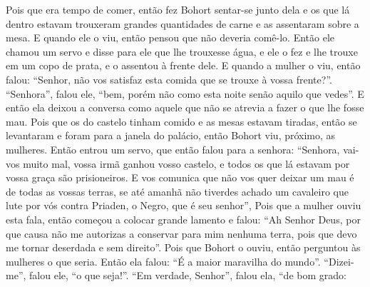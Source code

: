Pois que era tempo de comer, então fez Bohort sentar-se junto dela e os que lá
dentro estavam trouxeram grandes quantidades de carne e as assentaram sobre a
mesa. E quando ele o viu, então pensou que não deveria comê-lo. Então ele
chamou um servo e disse para ele que lhe trouxesse água, e ele o fez e lhe
trouxe em um copo de prata, e o assentou à frente dele. E quando a mulher o
viu, então falou: “Senhor, não vos satisfaz esta comida que se trouxe à vossa
frente?”. “Senhora”, falou ele, “bem, porém não como esta noite senão aquilo
que vedes”. E então ela deixou a conversa como aquele que não se atrevia a
fazer o que lhe fosse mau. Pois que os do castelo tinham comido e as mesas
estavam tiradas, então se levantaram e foram para a janela do palácio, então
Bohort viu, próximo, as mulheres. Então entrou um servo, que então falou para a
senhora: “Senhora, vai-vos muito mal, vossa irmã ganhou vosso castelo, e todos
os que lá estavam por vossa graça são prisioneiros. E vos comunica que não vos
quer deixar um mau é de todas as vossas terras, se até amanhã não tiverdes
achado um cavaleiro que lute por vós contra Priaden, o Negro, que é seu
senhor”, Pois que a mulher ouviu esta fala, então começou a colocar grande
lamento e falou: “Ah Senhor Deus, por que causa não me autorizas a conservar
para mim nenhuma terra, pois que devo me tornar deserdada e sem direito”. Pois
que Bohort o ouviu, então perguntou às mulheres o que seria. Então ela falou:
“É a maior maravilha do mundo”. “Dizei-me”, falou ele, “o que seja!”. “Em
verdade, Senhor”, falou ela, “de bom grado:

